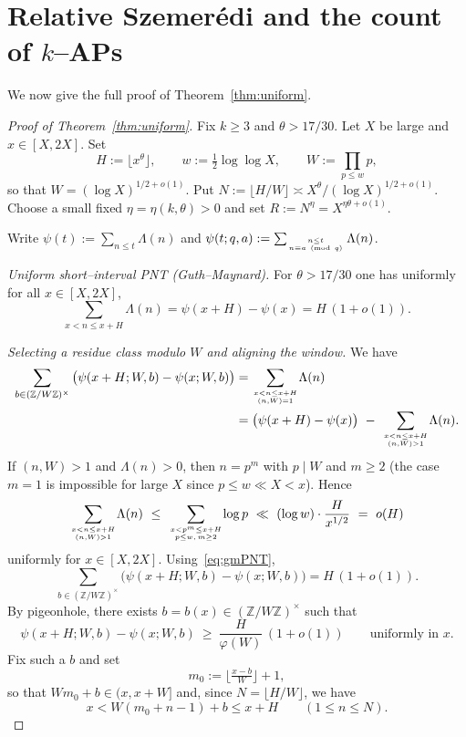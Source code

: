 \documentclass[11pt]{amsart}
\theoremstyle{definition}
\theoremstyle{remark}
\numberwithin{equation}{section}
\begin{document}
\section{Relative Szemerédi and the count of $k$--APs}\label{sec:rel-sz}
We now give the full proof of Theorem~\ref{thm:uniform}.

\begin{proof}[Proof of Theorem~\ref{thm:uniform}]
Fix $k\ge 3$ and $\theta>17/30$. Let $X$ be large and $x\in[X,2X]$. Set
\[
H:=\lfloor x^{\theta}\rfloor,\qquad w:=\tfrac12\log\log X,\qquad W:=\prod_{p\le w}p,
\]
so that $W=(\log X)^{1/2+o(1)}$. Put $N:=\lfloor H/W\rfloor\asymp X^{\theta}/(\log X)^{1/2+o(1)}$. Choose a small fixed $\eta=\eta(k,\theta)>0$ and set $R:=N^{\eta}=X^{\eta\theta+o(1)}$.

Write $\psi(t):=\sum_{n\le t}\Lambda(n)$ and $\psi(t;q,a):=\sum_{n\le t\atop n\equiv a\ (\mathrm{mod}\ q)}\Lambda(n)$.

\smallskip
\noindent\emph{Uniform short–interval PNT (Guth–Maynard).}
For $\theta>17/30$ one has uniformly for all $x\in[X,2X]$,
\begin{equation}\label{eq:gmPNT}
\sum_{x<n\le x+H}\!\Lambda(n)=\psi(x+H)-\psi(x)=H\,(1+o(1)).
\end{equation}

\smallskip
\noindent\emph{Selecting a residue class modulo $W$ and aligning the window.}
We have
\begin{align*}
\sum_{b\in(\mathbb Z/W\mathbb Z)^{\times}}\big(\psi(x+H;W,b)-\psi(x;W,b)\big)
&=\sum_{x<n\le x+H\atop (n,W)=1}\!\Lambda(n)\\
&=\big(\psi(x+H)-\psi(x)\big)\ -\ \sum_{x<n\le x+H\atop (n,W)>1}\!\Lambda(n).
\end{align*}
If $(n,W)>1$ and $\Lambda(n)>0$, then $n=p^m$ with $p\mid W$ and $m\ge2$ (the case $m=1$ is impossible for large $X$ since $p\le w\ll X<x$). Hence
\[
\sum_{x<n\le x+H\atop (n,W)>1}\!\Lambda(n)\ \le\ \sum_{x<p^m\le x+H\atop p\le w,\, m\ge2}\!\log p\ \ll\ (\log w)\cdot \frac{H}{x^{1/2}}\ =\ o(H)
\]
uniformly for $x\in[X,2X]$. Using~\eqref{eq:gmPNT},
\[
\sum_{b\in(\mathbb Z/W\mathbb Z)^{\times}}\big(\psi(x+H;W,b)-\psi(x;W,b)\big)=H\,(1+o(1)).
\]
By pigeonhole, there exists $b=b(x)\in(\mathbb Z/W\mathbb Z)^{\times}$ such that
\begin{equation}\label{eq:pigeon}
\psi(x+H;W,b)-\psi(x;W,b)\ \ge\ \frac{H}{\varphi(W)}\,(1+o(1))\qquad\text{uniformly in }x.
\end{equation}
Fix such a $b$ and set
\[
m_0:=\big\lfloor \tfrac{x-b}{W}\big\rfloor+1,
\]
so that $Wm_0+b\in(x,x+W]$ and, since $N=\lfloor H/W\rfloor$, we have
\[
x< W(m_0+n-1)+b\le x+H\qquad(1\le n\le N).
\]


\end{proof}
\end{document}
